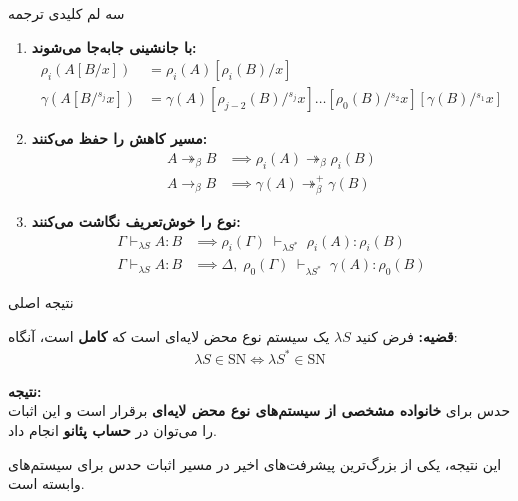 \documentclass[12pt, aspectratio=169]{beamer}
\begin{document}
\begin{frame}{سه لم کلیدی ترجمه}

{\small
\begin{enumerate}
  \item \textbf{با جانشینی جابه‌جا می‌شوند:}
  \begin{align*}
  \rho_i(A[B/x]) &= \rho_i(A)[\rho_i(B)/x]\\
  \gamma(A[B/{}^{s_{j}}x]) &= \gamma(A) [\rho_{j-2}(B)/{}^{s_{j}}x] \dots [\rho_{0}(B)/{}^{s_{2}}x] [\gamma(B)/{}^{s_{1}}x]
  \end{align*}
  \item \textbf{مسیر کاهش را حفظ می‌کنند:}
  \begin{align*}
  A \twoheadrightarrow_\beta B &\implies \rho_i(A) \twoheadrightarrow_\beta \rho_i(B)\\
  A \to_\beta B &\implies \gamma(A) \twoheadrightarrow^+_\beta \gamma(B)
  \end{align*}
  \item \textbf{نوع را خوش‌تعریف نگاشت می‌کنند:}
  \begin{align*}
  \Gamma \vdash_{\lambda S} A:B &\implies \rho_i(\Gamma) \; \vdash_{\lambda S^*} \; \rho_i(A):\rho_i(B)\\
  \Gamma \vdash_{\lambda S} A:B &\implies \Delta,\; \rho_0(\Gamma) \; \vdash_{\lambda S^*} \; \gamma(A) : \rho_0(B)
  \end{align*}
\end{enumerate}
}

\end{frame}

\begin{frame}{نتیجه اصلی }

\textbf{قضیه:} فرض کنید $\lambda S$ یک سیستم نوع محض لایه‌ای است که \textbf{کامل} است، آنگاه:
\begin{align*}
\lambda S \in \mathrm{SN} \iff \lambda S^* \in \mathrm{SN}
\end{align*}

\vfil
\textbf{نتیجه:}\\
حدس  برای \textbf{خانواده‌ مشخصی از سیستم‌های نوع محض لایه‌ای} برقرار است و این اثبات را می‌توان در \textbf{حساب پئانو} انجام داد.

\vfil
{\scriptsize این نتیجه، یکی از بزرگ‌ترین پیشرفت‌های اخیر در مسیر اثبات حدس  برای سیستم‌های وابسته است.}

\end{frame}
\end{document}
